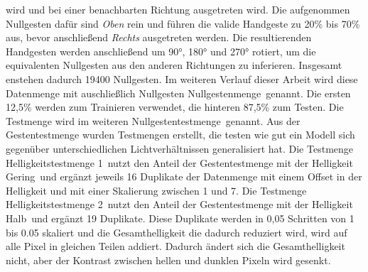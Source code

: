 wird und bei einer benachbarten Richtung ausgetreten wird. Die aufgenommen Nullgesten dafür sind \textit{Oben} rein und führen die valide Handgeste zu 20\% bis 70\% aus, bevor anschließend \textit{Rechts}
ausgetreten werden. Die resultierenden Handgesten werden anschließend um 90°, 180° und 270° rotiert, um die equivalenten Nullgesten aus den anderen Richtungen zu inferieren. Insgesamt enstehen dadurch 19400
Nullgesten. Im weiteren Verlauf dieser Arbeit wird diese Datenmenge mit auschließlich Nullgesten \glqq Nullgestenmenge\grqq\ genannt. Die ersten 12,5\% werden zum Trainieren verwendet, die hinteren 87,5\% zum
Testen. Die Testmenge wird im weiteren \glqq Nullgestentestmenge\grqq\ genannt.
\newline
\newline
Aus der Gestentestmenge wurden Testmengen erstellt, die testen wie gut ein Modell sich gegenüber unterschiedlichen Lichtverhältnissen generalisiert hat. Die Testmenge \glqq Helligkeitstestmenge 1\grqq\
nutzt den Anteil der Gestentestmenge mit der Helligkeit \glqq Gering\grqq\ und ergänzt jeweils 16 Duplikate der Datenmenge mit einem Offset in der Helligkeit und mit einer Skalierung zwischen 1 und 7.
Die Testmenge \glqq Helligkeitstestmenge 2\grqq\ nutzt den Anteil der Gestentestmenge mit der Helligkeit \glqq Halb\grqq\ und ergänzt 19 Duplikate. Diese Duplikate werden in 0,05 Schritten von 1 bis 0.05
skaliert und die Gesamthelligkeit die dadurch reduziert wird, wird auf alle Pixel in gleichen Teilen addiert. Dadurch ändert sich die Gesamthelligkeit nicht, aber der Kontrast zwischen hellen und dunklen
Pixeln wird gesenkt.